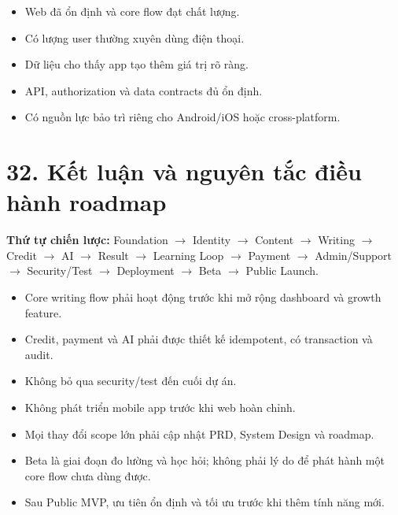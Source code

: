 \documentclass[
  11pt,
  a4paper,
]{article}
\begin{document}
\begin{itemize}
\item
  Web đã ổn định và core flow đạt chất lượng.
\item
  Có lượng user thường xuyên dùng điện thoại.
\item
  Dữ liệu cho thấy app tạo thêm giá trị rõ ràng.
\item
  API, authorization và data contracts đủ ổn định.
\item
  Có nguồn lực bảo trì riêng cho Android/iOS hoặc cross-platform.
\end{itemize}

\section{32. Kết luận và nguyên tắc điều hành
roadmap}\label{kux1ebft-luux1eadn-vuxe0-nguyuxean-tux1eafc-ux111iux1ec1u-huxe0nh-roadmap}

\textbf{Thứ tự chiến lược:} Foundation \(\rightarrow\) Identity \(\rightarrow\) Content \(\rightarrow\) Writing \(\rightarrow\)
Credit \(\rightarrow\) AI \(\rightarrow\) Result \(\rightarrow\) Learning Loop \(\rightarrow\) Payment \(\rightarrow\) Admin/Support \(\rightarrow\)
Security/Test \(\rightarrow\) Deployment \(\rightarrow\) Beta \(\rightarrow\) Public Launch.

\begin{itemize}
\item
  Core writing flow phải hoạt động trước khi mở rộng dashboard và growth
  feature.
\item
  Credit, payment và AI phải được thiết kế idempotent, có transaction và
  audit.
\item
  Không bỏ qua security/test đến cuối dự án.
\item
  Không phát triển mobile app trước khi web hoàn chỉnh.
\item
  Mọi thay đổi scope lớn phải cập nhật PRD, System Design và roadmap.
\item
  Beta là giai đoạn đo lường và học hỏi; không phải lý do để phát hành
  một core flow chưa dùng được.
\item
  Sau Public MVP, ưu tiên ổn định và tối ưu trước khi thêm tính năng
  mới.
\end{itemize}
\end{document}
